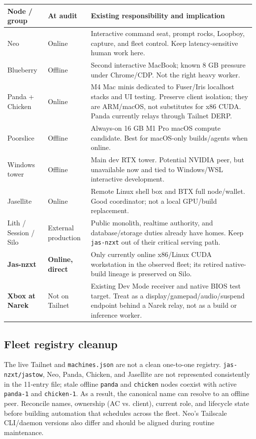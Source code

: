 \documentclass[11pt,letterpaper]{article}
\newcommand{\status}[2]{\textcolor{#1}{\textbf{#2}}}
\newcommand{\mono}[1]{\texttt{#1}}
\begin{document}
\begin{tabularx}{\textwidth}{@{}L{1.2in}L{1.2in}Y@{}}
\toprule
\textbf{Node / group} & \textbf{At audit} & \textbf{Existing responsibility and implication} \\
\midrule
Neo & Online & Interactive command seat, prompt rocks, Loopboy, capture, and fleet control. Keep latency-sensitive human work here. \\
Blueberry & Offline & Second interactive MacBook; known 8 GB pressure under Chrome/CDP. Not the right heavy worker. \\
Panda + Chicken & Online & M4 Mac minis dedicated to Fuser/Iris localhost stacks and UI testing. Preserve client isolation; they are ARM/macOS, not substitutes for x86 CUDA. Panda currently relays through Tailnet DERP. \\
Poorslice & Offline & Always-on 16 GB M1 Pro macOS compute candidate. Best for macOS-only builds/agents when online. \\
Windows tower & Offline & Main dev RTX tower. Potential NVIDIA peer, but unavailable now and tied to Windows/WSL interactive development. \\
Jasellite & Online & Remote Linux shell box and BTX full node/wallet. Good coordinator; not a local GPU/build replacement. \\
Lith / Session / Silo & External production & Public monolith, realtime authority, and database/storage duties already have homes. Keep \mono{jas-nzxt} out of their critical serving path. \\
\textbf{Jas-nzxt} & \status{Good}{Online, direct} & Only currently online x86/Linux CUDA workstation in the observed fleet; its retired native-build lineage is preserved on Silo. \\
\textbf{Xbox at Narek} & Not on Tailnet & Existing Dev Mode receiver and native BIOS test target. Treat as a display/gamepad/audio/suspend endpoint behind a Narek relay, not as a build or inference worker. \\
\bottomrule
\end{tabularx}

\subsection{Fleet registry cleanup}

The live Tailnet and \mono{machines.json} are not a clean one-to-one registry. \mono{jas-nzxt/jastow}, Neo, Panda, Chicken, and Jasellite are not represented consistently in the 11-entry file; stale offline \mono{panda} and \mono{chicken} nodes coexist with active \mono{panda-1} and \mono{chicken-1}. As a result, the canonical name can resolve to an offline peer. Reconcile names, ownership (AC vs. client), current role, and lifecycle state before building automation that schedules across the fleet. Neo's Tailscale CLI/daemon versions also differ and should be aligned during routine maintenance.
\end{document}
